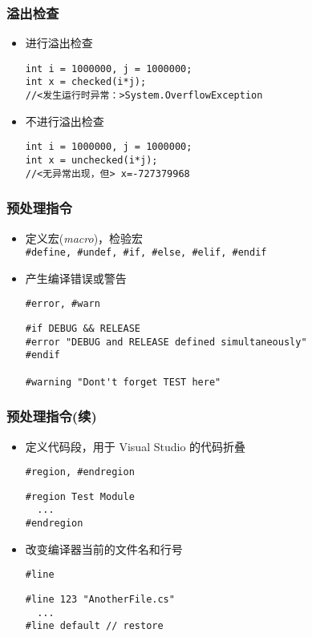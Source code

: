 \begin{frame}[fragile]
\frametitle{溢出检查}
\begin{itemize}
\item 进行溢出检查
\begin{lstlisting}[escapeinside=<>]
int i = 1000000, j = 1000000;
int x = checked(i*j);
//<发生运行时异常：>System.OverflowException

\end{lstlisting}

\item 不进行溢出检查
\begin{lstlisting}[escapeinside=<>]
int i = 1000000, j = 1000000;
int x = unchecked(i*j);
//<无异常出现，但> x=-727379968

\end{lstlisting}
\end{itemize}
\end{frame}


\begin{frame}[fragile]
\frametitle{预处理指令}
\begin{itemize}
\item 定义宏(\textit{macro})，检验宏\\

\texttt{\#define, \#undef, \#if, \#else, \#elif, \#endif}
\pause

\item 产生编译错误或警告

\texttt{\#error, \#warn}

\begin{lstlisting}
#if DEBUG && RELEASE
#error "DEBUG and RELEASE defined simultaneously"
#endif

#warning "Dont't forget TEST here"
\end{lstlisting}
\end{itemize}
\end{frame}

\begin{frame}[fragile]
\frametitle{预处理指令(续)}
\begin{itemize}
\item 定义代码段，用于 Visual Studio 的代码折叠

\texttt{\#region, \#endregion}

\begin{lstlisting}
#region Test Module
  ...
#endregion
\end{lstlisting}
\pause

\item 改变编译器当前的文件名和行号

\texttt{\#line}

\begin{lstlisting}
#line 123 "AnotherFile.cs"
  ...
#line default // restore
\end{lstlisting}
\end{itemize}

\end{frame}
